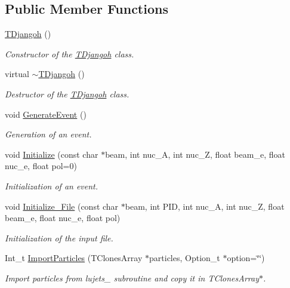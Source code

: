 \subsection*{Public Member Functions}
\begin{DoxyCompactItemize}
\item 
\hyperlink{class_t_djangoh_a7cbbb76ddc4fe82e25bb1e58078e45bc}{T\+Djangoh} ()
\begin{DoxyCompactList}\small\item\em Constructor of the \hyperlink{class_t_djangoh}{T\+Djangoh} class. \end{DoxyCompactList}\item 
virtual \hyperlink{class_t_djangoh_abee806f1e4536b30624590e34869f0e0}{$\sim$\+T\+Djangoh} ()
\begin{DoxyCompactList}\small\item\em Destructor of the \hyperlink{class_t_djangoh}{T\+Djangoh} class. \end{DoxyCompactList}\item 
void \hyperlink{class_t_djangoh_a121effe35c3f3ac168a4663bcd5eef5c}{Generate\+Event} ()
\begin{DoxyCompactList}\small\item\em Generation of an event. \end{DoxyCompactList}\item 
void \hyperlink{class_t_djangoh_a073e114a26b9d27e3dddcdcc0e955746}{Initialize} (const char $\ast$beam, int nuc\+\_\+\+A, int nuc\+\_\+\+Z, float beam\+\_\+e, float nuc\+\_\+e, float pol=0)
\begin{DoxyCompactList}\small\item\em Initialization of an event. \end{DoxyCompactList}\item 
void \hyperlink{class_t_djangoh_a4ac910303945724305714d4fb92c1806}{Initialize\+\_\+\+File} (const char $\ast$beam, int P\+I\+D, int nuc\+\_\+\+A, int nuc\+\_\+\+Z, float beam\+\_\+e, float nuc\+\_\+e, float pol)
\begin{DoxyCompactList}\small\item\em Initialization of the input file. \end{DoxyCompactList}\item 
Int\+\_\+t \hyperlink{class_t_djangoh_a69e5ebe63faa2dd00d9bcd217ecdf825}{Import\+Particles} (T\+Clones\+Array $\ast$particles, Option\+\_\+t $\ast$option=\char`\"{}\char`\"{})
\begin{DoxyCompactList}\small\item\em Import particles from lujets\+\_\+ subroutine and copy it in T\+Clones\+Array$\ast$. \end{DoxyCompactList}\item 

\end{DoxyCompactItemize}
